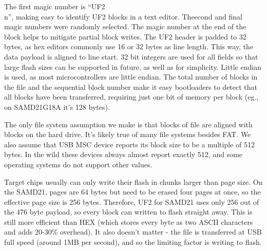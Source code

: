 The first magic number is ``UF2\\n'', making easy to identify UF2 blocks in a text editor.
Theecond and final magic numbers were randomly selected.
The magic number at the end of the block helps to mitigate partial block writes.
The UF2 header is padded to 32 bytes, as hex editors commonly use 16 or 32 bytes as line length. 
This way, the data payload is aligned to line start. 32 bit integers are used for all fields so that 
large flash sizes can be supported in future, as well as for simplicity.
Little endian is used, as most microcontrollers are little endian. 
The total number of blocks in the file and the sequential block number make it easy 
bootloaders to detect that all blocks have been transferred, requiring just one bit of 
memory per block (eg., on SAMD21G18A it's 128 bytes).

The only file system assumption we make is that blocks of file are aligned with blocks on the hard drive. 
It's likely true of many file systems besides FAT. We also assume that USB MSC device reports its block 
size to be a multiple of 512 bytes. In the wild these devices always almost report exactly 512, and some 
operating systems do not support other values.

Target chips usually can only write their flash in chunks larger than page size. On the SAMD21, pages are 64 bytes 
but need to be erased four pages at once, so the effective page size is 256 bytes. Therefore, UF2 for SAMD21 uses 
only 256 out of the 476 byte payload, so every block can written to flash straight away. This is still more 
efficient than HEX (which stores every byte as two ASCII characters and adds 20-30\% overhead). It also doesn’t 
matter - the file is transferred at USB full speed (around 1MB per second), and so the limiting factor is writing 
to flash.
